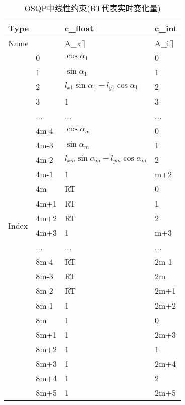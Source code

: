 \begin{table}[htbp]
  \caption{OSQP中线性约束(RT代表实时变化量)}
  \centering
  \begin{tabular}{@{}|l|l|l|l|@{}}
  \toprule
  \multicolumn{2}{|l|}{Type}     & c\_float   & c\_int     \\ \midrule
  \multicolumn{2}{|l|}{Name}     & A\_x{[}{]} & A\_i{[}{]} \\ \midrule
  \multirow{24}{*}{Index} 
  & 0    & $\cos \alpha_{1}$       & 0          \\ \cmidrule(l){2-4} 
  & 1  & $\sin \alpha_{1}$        & 1          \\ \cmidrule(l){2-4} 
  & 2  & ${l_{x 1} \sin \alpha_{1}-l_{y 1} \cos \alpha_{1}}$ & 2 \\ \cmidrule(l){2-4} 
  & 3    & 1          & 3          \\ \cmidrule(l){2-4} 
  & ...  & ...        & ...        \\ \cmidrule(l){2-4} 
  & 4m-4 & $\cos \alpha_{m}$        & 0          \\ \cmidrule(l){2-4} 
  & 4m-3 & $\sin \alpha_{m}$        & 1          \\ \cmidrule(l){2-4} 
  & 4m-2 & ${l_{x m} \sin \alpha_{m}-l_{y m} \cos \alpha_{m}}$  & 2 \\ \cmidrule(l){2-4} 
  & 4m-1 & 1          & m+2        \\ \cmidrule(l){2-4} 
  & 4m   & RT         & 0          \\ \cmidrule(l){2-4} 
  & 4m+1 & RT         & 1          \\ \cmidrule(l){2-4} 
  & 4m+2 & RT         & 2          \\ \cmidrule(l){2-4} 
  & 4m+3 & 1          & m+3        \\ \cmidrule(l){2-4} 
  & ...  & ...        & ...        \\ \cmidrule(l){2-4} 
  & 8m-4 & RT         & 2m-1       \\ \cmidrule(l){2-4} 
  & 8m-3 & RT         & 2m         \\ \cmidrule(l){2-4} 
  & 8m-2 & RT         & 2m+1       \\ \cmidrule(l){2-4} 
  & 8m-1 & 1          & 2m+2       \\ \cmidrule(l){2-4} 
  & 8m   & 1          & 0          \\ \cmidrule(l){2-4} 
  & 8m+1 & 1          & 2m+3       \\ \cmidrule(l){2-4} 
  & 8m+2 & 1          & 1          \\ \cmidrule(l){2-4} 
  & 8m+3 & 1          & 2m+4       \\ \cmidrule(l){2-4} 
  & 8m+4 & 1          & 2          \\ \cmidrule(l){2-4} 
  & 8m+5 & 1          & 2m+5       \\ \bottomrule
  \end{tabular}
  \label{tab:osqpconstraints}
\end{table}



